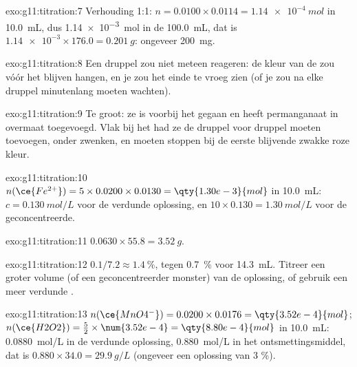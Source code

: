 \begin{solution}{exo:g11:titration:7}
Verhouding 1:1: $n = 0.0100 \times 0.0114 = \qty{1.14e-4}{mol}$ in
\qty{10.0}{mL}, dus \qty{1.14e-3}{mol} in de \qty{100.0}{mL}, dat is
$\num{1.14e-3} \times 176.0 = \qty{0.201}{g}$: ongeveer \qty{200}{mg}.
\end{solution}

\begin{solution}{exo:g11:titration:8}
Een druppel zou niet meteen reageren: de kleur van de  zou vóór
het  blijven hangen, en je zou het einde te vroeg zien
(of je zou na elke druppel minutenlang moeten wachten).
\end{solution}

\begin{solution}{exo:g11:titration:9}
Te groot: ze is voorbij het  gegaan en heeft
permanganaat in overmaat toegevoegd. Vlak bij het  had ze
de  druppel voor druppel moeten toevoegen, onder zwenken, en
moeten stoppen bij de eerste blijvende zwakke roze kleur.
\end{solution}

\begin{solution}{exo:g11:titration:10}
$n(\ce{Fe^{2+}}) = 5 \times 0.0200 \times 0.0130 = \qty{1.30e-3}{mol}$ in
\qty{10.0}{mL}: $c = \qty{0.130}{mol/L}$ voor de verdunde oplossing, en
$10 \times 0.130 = \qty{1.30}{mol/L}$ voor de geconcentreerde.
\end{solution}

\begin{solution}{exo:g11:titration:11}
$0.0630 \times 55.8 = \qty{3.52}{g}$.
\end{solution}

\begin{solution}{exo:g11:titration:12}
$0.1 / 7.2 \approx \qty{1.4}{\percent}$, tegen
\qty{0.7}{\percent} voor \qty{14.3}{mL}. Titreer een groter volume (of
een geconcentreerder monster) van de oplossing, of gebruik een meer
verdunde .
\end{solution}

\begin{solution}{exo:g11:titration:13}
$n(\ce{MnO4^-}) = 0.0200 \times 0.0176 = \qty{3.52e-4}{mol}$;
$n(\ce{H2O2}) = \frac{5}{2} \times \num{3.52e-4} = \qty{8.80e-4}{mol}$ in
\qty{10.0}{mL}: \qty{0.0880}{mol/L} in de verdunde oplossing,
\qty{0.880}{mol/L} in het ontsmettingsmiddel, dat is
$0.880 \times 34.0 = \qty{29.9}{g/L}$ (ongeveer een oplossing van 3 \%).
\end{solution}

